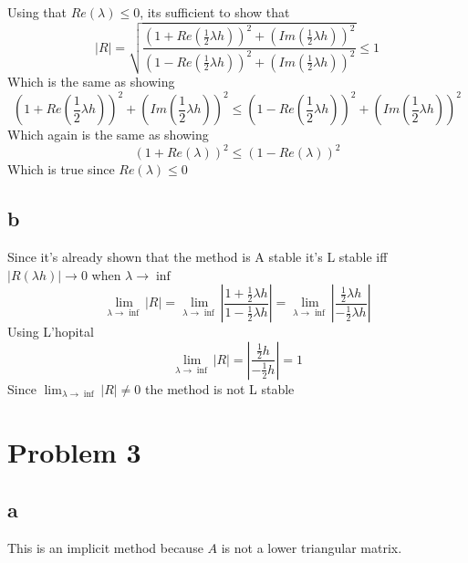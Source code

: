 \documentclass[11pt]{article}
\newcommand{\abs}[1]{|#1|}
\begin{document}
Using that $Re(\lambda) \leq 0$, its sufficient to show that
\[\abs{R} = \sqrt{\frac{(1 + Re(\frac{1}{2}\lambda h))^2 + (Im(\frac{1}{2}\lambda h))^2}{(1 - Re(\frac{1}{2}\lambda h))^2 + (Im(\frac{1}{2}\lambda h))^2}} \leq 1 \]
Which is the same as showing
\[ (1 + Re(\frac{1}{2}\lambda h))^2 + (Im(\frac{1}{2}\lambda h))^2 \leq (1 - Re(\frac{1}{2}\lambda h))^2 + (Im(\frac{1}{2}\lambda h))^2 \]
Which again is the same as showing
\[ (1 + Re(\lambda))^2 \leq (1 - Re(\lambda))^2 \]
Which is true since $Re(\lambda) \leq 0$

\subsection*{b}
Since it's already shown that the method is A stable it's L stable iff $\abs{R(\lambda h)} \rightarrow 0$ when $\lambda \rightarrow \inf$
\[\lim_{\lambda \rightarrow \inf} \abs{R} = \lim_{\lambda \rightarrow \inf} \abs{\frac{1 + \frac{1}{2} \lambda h}{1 - \frac{1}{2} \lambda h}} = \lim_{\lambda \rightarrow \inf} \abs{\frac{\frac{1}{2} \lambda h}{-\frac{1}{2} \lambda h}} \]
Using L'hopital
\[\lim_{\lambda \rightarrow \inf} \abs{R} = \abs{\frac{\frac{1}{2}h}{-\frac{1}{2}h}} = 1 \]
Since $\lim_{\lambda \rightarrow \inf} \abs{R} \not = 0$ the method is not L stable


\section*{Problem 3}
\subsection*{a}
This is an implicit method because $A$ is not a lower triangular matrix.
\end{document}
